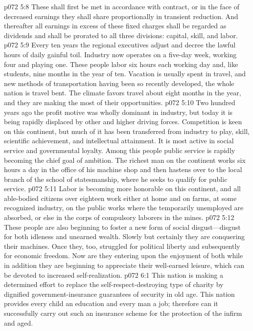 \pc \vs p072 5:8 These shall first be met in accordance with contract, or in the face of decreased earnings they shall share proportionally in transient reduction. And thereafter all earnings in excess of these fixed charges shall be regarded as dividends and shall be prorated to all three divisions: capital, skill, and labor.
\pc \vs p072 5:9 Every ten years the regional executives adjust and decree the lawful hours of daily gainful toil. Industry now operates on a five\hyp{}day week, working four and playing one. These people labor six hours each working day and, like students, nine months in the year of ten. Vacation is usually spent in travel, and new methods of transportation having been so recently developed, the whole nation is travel bent. The climate favors travel about eight months in the year, and they are making the most of their opportunities.
\pc \vs p072 5:10 Two hundred years ago the profit motive was wholly dominant in industry, but today it is being rapidly displaced by other and higher driving forces. Competition is keen on this continent, but much of it has been transferred from industry to play, skill, scientific achievement, and intellectual attainment. It is most active in social service and governmental loyalty. Among this people public service is rapidly becoming the chief goal of ambition. The richest man on the continent works six hours a day in the office of his machine shop and then hastens over to the local branch of the school of statesmanship, where he seeks to qualify for public service.\plusone
\vs p072 5:11 Labor is becoming more honorable on this continent, and all able\hyp{}bodied citizens over eighteen work either at home and on farms, at some recognized industry, on the public works where the temporarily unemployed are absorbed, or else in the corps of compulsory laborers in the mines.
\vs p072 5:12 These people are also beginning to foster a new form of social disgust---disgust for both idleness and unearned wealth. Slowly but certainly they are conquering their machines. Once they, too, struggled for political liberty and subsequently for economic freedom. Now are they entering upon the enjoyment of both while in addition they are beginning to appreciate their well\hyp{}earned leisure, which can be devoted to increased self\hyp{}realization.
\vs p072 6:1 This nation is making a determined effort to replace the self\hyp{}respect\hyp{}destroying type of charity by dignified government\hyp{}insurance guarantees of security in old age. This nation provides every child an education and every man a job; therefore can it successfully carry out such an insurance scheme for the protection of the infirm and aged.
